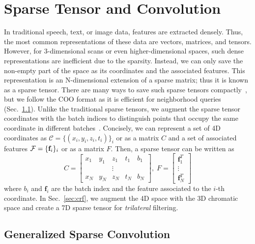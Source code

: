 \section{Sparse Tensor and Convolution}
\label{sec:sparse}

In traditional speech, text, or image data, features are extracted densely. Thus, the most common representations of these data are vectors, matrices, and tensors. However, for 3-dimensional scans or even higher-dimensional spaces, such dense representations are inefficient due to the sparsity. Instead, we can only save the non-empty part of the space as its coordinates and the associated features. This representation is an N-dimensional extension of a sparse matrix; thus it is known as a sparse tensor. There are many ways to save such sparse tensors compactly~\cite{sparsetensor}, but we follow the COO format as it is efficient for neighborhood queries (Sec.~\ref{sec:sparse_convolution}). Unlike the traditional sparse tensors, we augment the sparse tensor coordinates with the batch indices to distinguish points that occupy the same coordinate in different batches~\cite{sparse3dcnn}. Concisely, we can represent a set of 4D coordinates as $\mathcal{C} = \{(x_i, y_i, z_i, t_i)\}_i$ or as a matrix $C$ and a set of associated features $\mathcal{F} = \{\mathbf{f}_i\}_i$ or as a matrix $F$. Then, a sparse tensor can be written as
\begin{equation}
C = \begin{bmatrix}
x_1 & y_1 & z_1 & t_1 & b_1\\ 
    &     & \vdots &  &     \\ 
x_N & y_N & z_N & t_N & b_N
\end{bmatrix}, \;
F = \begin{bmatrix}
\mathbf{f}_1^T\\ 
\vdots\\ 
\mathbf{f}_N^T
\end{bmatrix}
\end{equation}
where $b_i$ and $\mathbf{f}_i$ are the batch index and the feature associated to the $i$-th coordinate. In Sec.~\ref{sec:crf}, we augment the 4D space with the 3D chromatic space and create a 7D sparse tensor for \textit{trilateral} filtering.


\subsection{Generalized Sparse Convolution}
\label{sec:sparse_convolution}


